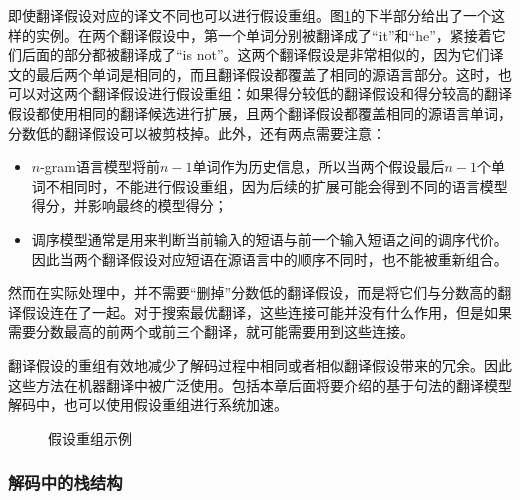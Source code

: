 \parinterval 即使翻译假设对应的译文不同也可以进行假设重组。图\ref{fig:4-29}的下半部分给出了一个这样的实例。在两个翻译假设中，第一个单词分别被翻译成了``it''和``he''，紧接着它们后面的部分都被翻译成了``is not''。这两个翻译假设是非常相似的，因为它们译文的最后两个单词是相同的，而且翻译假设都覆盖了相同的源语言部分。这时，也可以对这两个翻译假设进行假设重组：如果得分较低的翻译假设和得分较高的翻译假设都使用相同的翻译候选进行扩展，且两个翻译假设都覆盖相同的源语言单词，分数低的翻译假设可以被剪枝掉。此外，还有两点需要注意：

\begin{itemize}
\vspace{0.5em}
\item $n$-gram语言模型将前$n-1$单词作为历史信息，所以当两个假设最后$n-1$个单词不相同时，不能进行假设重组，因为后续的扩展可能会得到不同的语言模型得分，并影响最终的模型得分；
\vspace{0.5em}
\item 调序模型通常是用来判断当前输入的短语与前一个输入短语之间的调序代价。因此当两个翻译假设对应短语在源语言中的顺序不同时，也不能被重新组合。
\vspace{0.5em}
\end{itemize}

\parinterval 然而在实际处理中，并不需要``删掉''分数低的翻译假设，而是将它们与分数高的翻译假设连在了一起。对于搜索最优翻译，这些连接可能并没有什么作用，但是如果需要分数最高的前两个或前三个翻译，就可能需要用到这些连接。

\parinterval 翻译假设的重组有效地减少了解码过程中相同或者相似翻译假设带来的冗余。因此这些方法在机器翻译中被广泛使用。包括本章后面将要介绍的基于句法的翻译模型解码中，也可以使用假设重组进行系统加速。

\begin{figure}[htp]
\centering

\caption{假设重组示例}
\label{fig:4-29}
\end{figure}


\subsubsection{解码中的栈结构}

